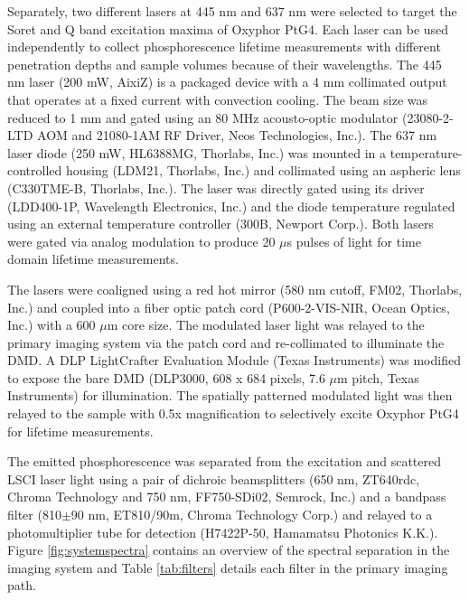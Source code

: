 Separately, two different lasers at 445 nm and 637 nm were selected to target the Soret and Q band excitation maxima of Oxyphor PtG4. Each laser can be used independently to collect phosphorescence lifetime measurements with different penetration depths and sample volumes because of their wavelengths. The 445 nm laser (200 mW, AixiZ) is a packaged device with a 4 mm collimated output that operates at a fixed current with convection cooling. The beam size was reduced to 1 mm and gated using an 80 MHz acousto-optic modulator (23080-2-LTD AOM and 21080-1AM RF Driver, Neos Technologies, Inc.). The 637 nm laser diode (250 mW, HL6388MG, Thorlabs, Inc.) was mounted in a temperature-controlled housing (LDM21, Thorlabs, Inc.) and collimated using an aspheric lens (C330TME-B, Thorlabs, Inc.). The laser was directly gated using its driver (LDD400-1P, Wavelength Electronics, Inc.) and the diode temperature regulated using an external temperature controller (300B, Newport Corp.). Both lasers were gated via analog modulation to produce 20 $\mu$s pulses of light for time domain lifetime measurements.

The lasers were coaligned using a red hot mirror (580 nm cutoff, FM02, Thorlabs, Inc.) and coupled into a fiber optic patch cord (P600-2-VIS-NIR, Ocean Optics, Inc.) with a 600 $\mu$m core size. The modulated laser light was relayed to the primary imaging system via the patch cord and re-collimated to illuminate the DMD. A DLP LightCrafter Evaluation Module (Texas Instruments) was modified to expose the bare DMD (DLP3000, 608 x 684 pixels, 7.6 $\mu$m pitch, Texas Instruments) for illumination. The spatially patterned modulated light was then relayed to the sample with 0.5x magnification to selectively excite Oxyphor PtG4 for lifetime measurements.

The emitted phosphorescence was separated from the excitation and scattered LSCI laser light using a pair of dichroic beamsplitters (650 nm, ZT640rdc, Chroma Technology and 750 nm, FF750-SDi02, Semrock, Inc.) and a bandpass filter (810$\pm$90 nm, ET810/90m, Chroma Technology Corp.) and relayed to a photomultiplier tube for detection (H7422P-50, Hamamatsu Photonics K.K.). Figure \ref{fig:systemspectra} contains an overview of the spectral separation in the imaging system and Table \ref{tab:filters} details each filter in the primary imaging path.

